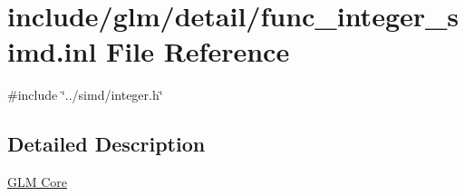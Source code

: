 \hypertarget{func__integer__simd_8inl}{}\section{include/glm/detail/func\+\_\+integer\+\_\+simd.inl File Reference}
\label{func__integer__simd_8inl}
{\ttfamily \#include \char`\"{}../simd/integer.\+h\char`\"{}}\newline


\subsection{Detailed Description}
\hyperlink{group__core}{G\+LM Core} 